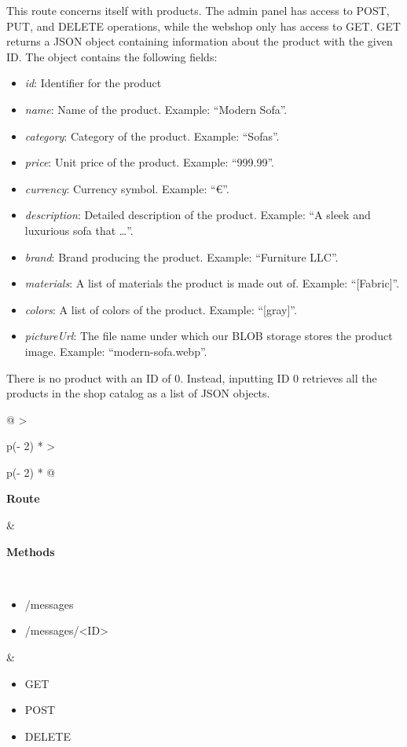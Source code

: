 This route concerns itself with products. The admin panel has access to POST, PUT, and DELETE operations, 
while the webshop only has access to GET. GET returns a JSON object containing information about
the product with the given ID.
The object contains the following fields:
\begin{itemize}
    \item \textit{id}: Identifier for the product
    \item \textit{name}: Name of the product. Example: “Modern Sofa”.
    \item \textit{category}: Category of the product. Example: “Sofas”.
    \item \textit{price}: Unit price of the product. Example: “999.99”.
    \item \textit{currency}: Currency symbol. Example: “€”.
    \item \textit{description}: Detailed description of the product. Example: “A sleek and luxurious sofa that \dots”.
    \item \textit{brand}: Brand producing the product. Example: “Furniture LLC”.
    \item \textit{materials}: A list of materials the product is made out of. Example: “[Fabric]”.
    \item \textit{colors}: A list of colors of the product. Example: “[gray]”.
    \item \textit{pictureUrl}: The file name under which our BLOB storage stores the product image. Example: “modern-sofa.webp”.
\end{itemize}
There is no product with an ID of 0. Instead, inputting ID 0 retrieves all the products in the shop catalog
as a list of JSON objects.

\begin{longtable}[]{@{}
    >{\raggedright\arraybackslash}p{(\columnwidth - 2\tabcolsep) * }
    >{\raggedright\arraybackslash}p{(\columnwidth - 2\tabcolsep) * }@{}}
\toprule
\begin{minipage}[b]{\linewidth}\raggedright
\textbf{Route}
\end{minipage} & \begin{minipage}[b]{\linewidth}\raggedright
\textbf{Methods}
\end{minipage} \\
\midrule
\endhead
\begin{itemize}
    \item /messages
    \item /messages/<ID>
\end{itemize} &
\begin{itemize}
    \item GET
    \item POST
    \item DELETE
\end{itemize} \\
\bottomrule
\end{longtable}

